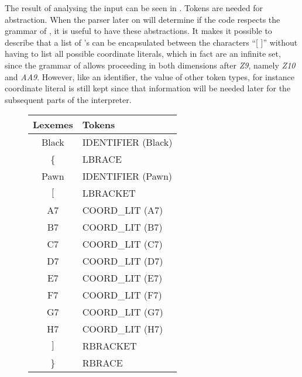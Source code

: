 

The result of analysing the input can be seen in . Tokens are needed for abstraction. When the parser later on will determine if the code respects the grammar of \productname{}, it is useful to have these abstractions. It makes it possible to describe that a list of 's can be encapsulated between the characters ``[ ]'' without having to list all possible coordinate literals, which in fact are an infinite set, since the grammar of \productname{} allows proceeding in both dimensions after \textit{Z9}, namely \textit{Z10} and \textit{AA9}. However, like an identifier, the value of other token types, for instance coordinate literal is still kept since that information will be needed later for the subsequent parts of the interpreter.

\begin{figure}
	\centering
		\begin{tabular}{|c|l|}
        	\hline
        	\textbf{Lexemes} & \textbf{Tokens} 	\\ 
        	\hline
        	Black   & IDENTIFIER (Black) 		\\ 
        	\{      & LBRACE             		\\ 
        	Pawn    & IDENTIFIER (Pawn)  		\\ 
    	    $[$     & LBRACKET           		\\ 
	        A7      & COORD\_LIT (A7)     		\\ 
  	    	B7      & COORD\_LIT (B7)     		\\ 
        	C7      & COORD\_LIT (C7)     		\\ 
        	D7      & COORD\_LIT (D7)     		\\ 
        	E7      & COORD\_LIT (E7)     		\\ 
        	F7      & COORD\_LIT (F7)     		\\ 
        	G7      & COORD\_LIT (G7)     		\\ 
        	H7      & COORD\_LIT (H7)     		\\ 
        	$]$     & RBRACKET           		\\ 
        	\}      & RBRACE            		\\ 
        	\hline
		\end{tabular}
	\label{table:lexemestotokens}
\end{figure}


